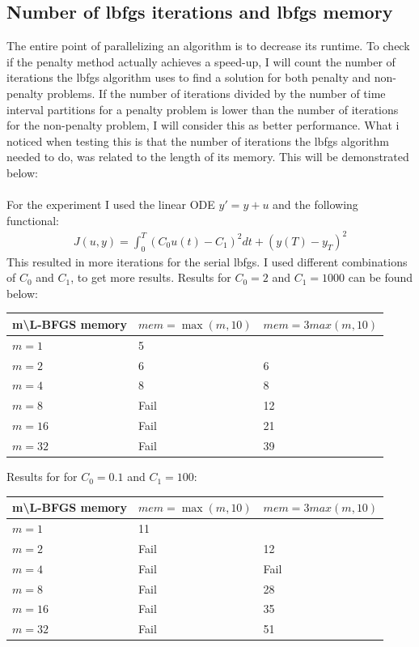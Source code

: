 \documentclass[11pt,a4paper]{article}
\begin{document}
\subsection{Number of lbfgs iterations and lbfgs memory}
The entire point of parallelizing an algorithm is to decrease its runtime. To check if the penalty method actually achieves a speed-up, I will count the number of iterations the lbfgs algorithm uses to find a solution for both penalty and non-penalty problems. If the number of iterations divided by the number of time interval partitions for a penalty problem is lower than the number of iterations for the non-penalty problem, I will consider this as better performance. What i noticed when testing this is that the number of iterations the lbfgs algorithm needed to do, was related to the length of its memory. This will be demonstrated below: 
\\
\\   
For the experiment I used the linear ODE $y'=y+u$ and the following functional: 
\begin{align*}
J(u,y)=\int_0^T (C_0u(t)-C_1)^2dt + (y(T)-y_T)^2
\end{align*}
This resulted in more iterations for the serial lbfgs. I used different combinations of $C_0$ and $C_1$, to get more results. Results for $C_0=2 $ and $C_1= 1000$ can be found below:
\begin{center}
    \begin{tabular}{| l | l | l |}
    \hline
    m\textbackslash L-BFGS memory & $mem =\max(m,10)$& $mem=3max(m,10)$\\ \hline
    $m=1$  &  5 &  \\ \hline
    $m=2$  &  6 &  6	\\ \hline
    $m=4$ &  8 & 8 \\ \hline
    $m=8$ &  Fail &  12	\\ \hline
    $m=16$ &  Fail & 21 \\ \hline
    $m=32$ &  Fail &  39	\\ \hline
    \end{tabular}
\end{center}
Results for for $C_0=0.1 $ and $C_1= 100$:
\begin{center}
    \begin{tabular}{| l | l | l |}
    \hline
    m\textbackslash L-BFGS memory & $mem =\max(m,10)$& $mem=3max(m,10)$\\ \hline
    $m=1$  &  11 &  \\ \hline
    $m=2$  &  Fail &  12	\\ \hline
    $m=4$ &  Fail & Fail \\ \hline
    $m=8$ &  Fail &  28	\\ \hline
    $m=16$ &  Fail & 35 \\ \hline
    $m=32$ &  Fail &  51	\\ \hline
    \end{tabular}
\end{center}
\end{document}
